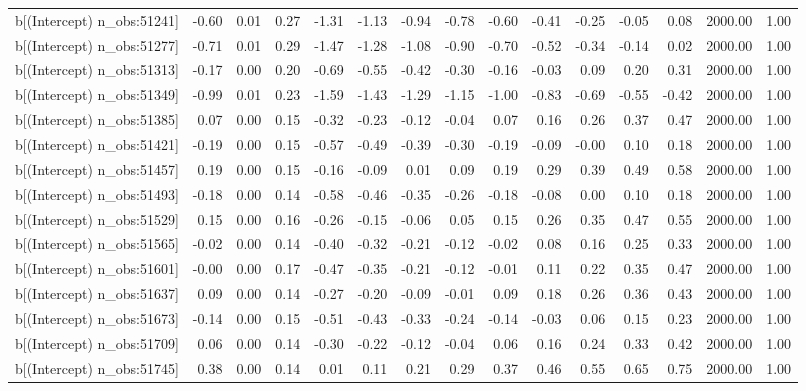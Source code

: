 \begin{table}[ht]
\begin{tabular}{rrrrrrrrrrrrrrr}
  b[(Intercept) n\_obs:51241] & -0.60 & 0.01 & 0.27 & -1.31 & -1.13 & -0.94 & -0.78 & -0.60 & -0.41 & -0.25 & -0.05 & 0.08 & 2000.00 & 1.00 \\ 
  b[(Intercept) n\_obs:51277] & -0.71 & 0.01 & 0.29 & -1.47 & -1.28 & -1.08 & -0.90 & -0.70 & -0.52 & -0.34 & -0.14 & 0.02 & 2000.00 & 1.00 \\ 
  b[(Intercept) n\_obs:51313] & -0.17 & 0.00 & 0.20 & -0.69 & -0.55 & -0.42 & -0.30 & -0.16 & -0.03 & 0.09 & 0.20 & 0.31 & 2000.00 & 1.00 \\ 
  b[(Intercept) n\_obs:51349] & -0.99 & 0.01 & 0.23 & -1.59 & -1.43 & -1.29 & -1.15 & -1.00 & -0.83 & -0.69 & -0.55 & -0.42 & 2000.00 & 1.00 \\ 
  b[(Intercept) n\_obs:51385] & 0.07 & 0.00 & 0.15 & -0.32 & -0.23 & -0.12 & -0.04 & 0.07 & 0.16 & 0.26 & 0.37 & 0.47 & 2000.00 & 1.00 \\ 
  b[(Intercept) n\_obs:51421] & -0.19 & 0.00 & 0.15 & -0.57 & -0.49 & -0.39 & -0.30 & -0.19 & -0.09 & -0.00 & 0.10 & 0.18 & 2000.00 & 1.00 \\ 
  b[(Intercept) n\_obs:51457] & 0.19 & 0.00 & 0.15 & -0.16 & -0.09 & 0.01 & 0.09 & 0.19 & 0.29 & 0.39 & 0.49 & 0.58 & 2000.00 & 1.00 \\ 
  b[(Intercept) n\_obs:51493] & -0.18 & 0.00 & 0.14 & -0.58 & -0.46 & -0.35 & -0.26 & -0.18 & -0.08 & 0.00 & 0.10 & 0.18 & 2000.00 & 1.00 \\ 
  b[(Intercept) n\_obs:51529] & 0.15 & 0.00 & 0.16 & -0.26 & -0.15 & -0.06 & 0.05 & 0.15 & 0.26 & 0.35 & 0.47 & 0.55 & 2000.00 & 1.00 \\ 
  b[(Intercept) n\_obs:51565] & -0.02 & 0.00 & 0.14 & -0.40 & -0.32 & -0.21 & -0.12 & -0.02 & 0.08 & 0.16 & 0.25 & 0.33 & 2000.00 & 1.00 \\ 
  b[(Intercept) n\_obs:51601] & -0.00 & 0.00 & 0.17 & -0.47 & -0.35 & -0.21 & -0.12 & -0.01 & 0.11 & 0.22 & 0.35 & 0.47 & 2000.00 & 1.00 \\ 
  b[(Intercept) n\_obs:51637] & 0.09 & 0.00 & 0.14 & -0.27 & -0.20 & -0.09 & -0.01 & 0.09 & 0.18 & 0.26 & 0.36 & 0.43 & 2000.00 & 1.00 \\ 
  b[(Intercept) n\_obs:51673] & -0.14 & 0.00 & 0.15 & -0.51 & -0.43 & -0.33 & -0.24 & -0.14 & -0.03 & 0.06 & 0.15 & 0.23 & 2000.00 & 1.00 \\ 
  b[(Intercept) n\_obs:51709] & 0.06 & 0.00 & 0.14 & -0.30 & -0.22 & -0.12 & -0.04 & 0.06 & 0.16 & 0.24 & 0.33 & 0.42 & 2000.00 & 1.00 \\ 
  b[(Intercept) n\_obs:51745] & 0.38 & 0.00 & 0.14 & 0.01 & 0.11 & 0.21 & 0.29 & 0.37 & 0.46 & 0.55 & 0.65 & 0.75 & 2000.00 & 1.00 \\ 

\end{tabular}
\end{table}

